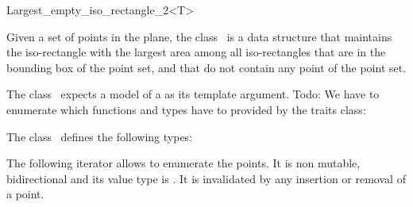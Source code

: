 

\begin{ccRefClass}{Largest_empty_iso_rectangle_2<T>}


\ccDefinition
  
Given a set of points in the plane, the class \ccRefName\ is a data
structure that maintains the iso-rectangle with the largest area among
all iso-rectangles that are in the bounding box of the point set, and
that do not contain any point of the point set.

The class \ccRefName\ expects a model of a  as its template argument.  Todo: We have to enumerate which
functions and types have to provided by the traits class: 



\ccTypes
The class \ccClassTemplateName\ defines the following types:

\ccThreeToTwo


\ccGlue
{}


The following iterator allows to enumerate the points. 
It is non mutable, bidirectional
and its value type is . 
It is invalidated by any insertion or removal of a point. 






\ccCreation
{}  %


\end{ccRefClass}
